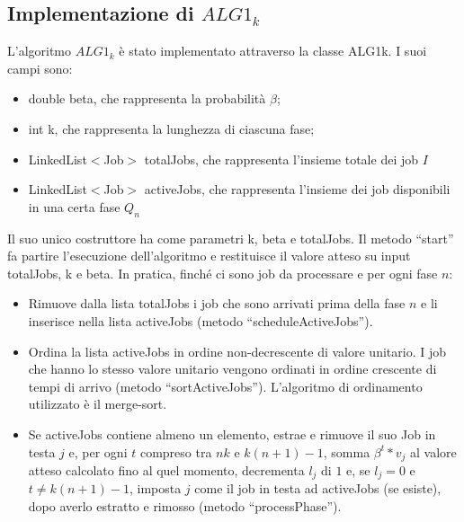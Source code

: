 \documentclass[12pt]{article}
\begin{document}
\subsection{Implementazione di $ALG1_{k}$}
L’algoritmo $ALG1_{k}$ è stato implementato attraverso la classe ALG1k. I suoi campi sono:
\begin{itemize}
\item{double beta, che rappresenta la probabilità $\beta$;}
\item{int k, che rappresenta la lunghezza di ciascuna fase;}
\item{LinkedList$<$Job$>$ totalJobs, che rappresenta l’insieme totale dei job $I$}
\item{LinkedList$<$Job$>$ activeJobs, che rappresenta l’insieme dei job disponibili in una certa fase $Q_{n}$}
\end{itemize}
Il suo unico costruttore ha come parametri k, beta e totalJobs. Il metodo “start” fa partire l’esecuzione dell’algoritmo e restituisce il valore atteso su input totalJobs, k e beta. In pratica, finché ci sono job da processare e per ogni fase $n$:
\begin{itemize}
\item{Rimuove dalla lista totalJobs i job che sono arrivati prima della fase $n$ e li inserisce nella lista activeJobs (metodo “scheduleActiveJobs”).}
\item{Ordina la lista activeJobs in ordine non-decrescente di valore unitario. I job che hanno lo stesso valore unitario  vengono ordinati in ordine crescente di tempi di arrivo (metodo “sortActiveJobs”). L’algoritmo di ordinamento utilizzato è il merge-sort.}
\item{Se activeJobs contiene almeno un elemento, estrae e rimuove il suo Job in testa $j$  e, per ogni $t$ compreso tra $nk$ e $k(n + 1) - 1$, somma $\beta^{t} * v_{j}$ al valore atteso calcolato fino al quel momento, decrementa $l_{j}$ di $1$ e, se $l_{j} = 0$ e $t \neq k(n + 1) - 1$, imposta $j$ come il job in testa ad activeJobs (se esiste), dopo averlo estratto e rimosso (metodo “processPhase”).}
\end{itemize}
\end{document}
